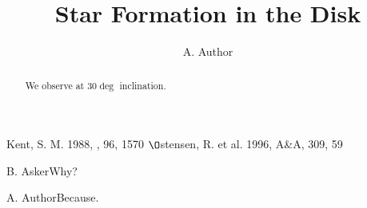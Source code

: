 
\title{Star Formation in the Disk}
\author{A. Author}
\begin{abstract}We observe at $30\deg$ inclination.\end{abstract}
\begin{references}
 Kent, S. M. 1988, \aj, 96, 1570
 $\O$stensen, R. et al. 1996, A\&A, 309, 59
\end{references}
\begin{question}{B. Asker}Why?\end{question}
\begin{answer}{A. Author}Because.\end{answer}

